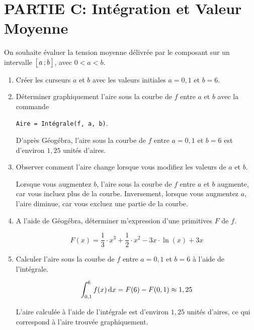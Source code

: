\documentclass[11pt, a4paper]{report}
\begin{document}
\pagebreak
\thispagestyle{DS_LP}

\section*{PARTIE C\@: Intégration et Valeur Moyenne}

On souhaite évaluer la tension moyenne délivrée par le composant sur un intervalle $\bigl[ \, a \, ; b \,\bigl]$, avec $0<a<b$.

\begin{enumerate}[resume]
    \item Créer les curseurs $a$ et $b$ avec les valeurs initiales $a=0,1$ et $b=6$.  
    \item Déterminer graphiquement l'aire sous la courbe de $f$ entre $a$ et $b$ avec la commande 
    
    \verb|Aire = Intégrale(f, a, b)|.  
    \begin{blocvisible}[height=2]
        D'après Géogébra, l'aire sous la courbe de $f$ entre $a=0,1$ et $b=6$ est d'environ $1,25$ unités d'aires.
    \end{blocvisible}
        
    \item Observer comment l'aire change lorsque vous modifiez les valeurs de $a$ et $b$. 
    \begin{blocvisible}[height=3]
        Lorsque vous augmentez $b$, l'aire sous la courbe de $f$ entre $a$ et $b$ augmente, car vous incluez plus de la courbe. Inversement, lorsque vous augmentez $a$, l'aire diminue, car vous excluez une partie de la courbe.
    \end{blocvisible}

    \item A l'aide de Géogébra, déterminer m'expression d'une primitives $F$ de $f$. 
    \begin{blocvisible}[height=2]
        \[F(x) = \frac{1}{3}\cdot x^3 + \frac{1}{2} \cdot x^2 - 3x\cdot \ln(x) + 3x\]
    \end{blocvisible}

    \item Calculer l'aire sous la courbe de $f$ entre $a=0,1$ et $b=6$ à l'aide de l'intégrale. 
    \begin{blocvisible}[height=3]
        \[\int_{0,1}^6 f(x) \,\mathrm{d}x = F(6) - F(0,1) \approx 1,25\]

        L'aire calculée à l'aide de l'intégrale est d'environ $1,25$ unités d'aires, ce qui correspond à l'aire trouvée graphiquement.
    \end{blocvisible}


\end{enumerate}
\end{document}
